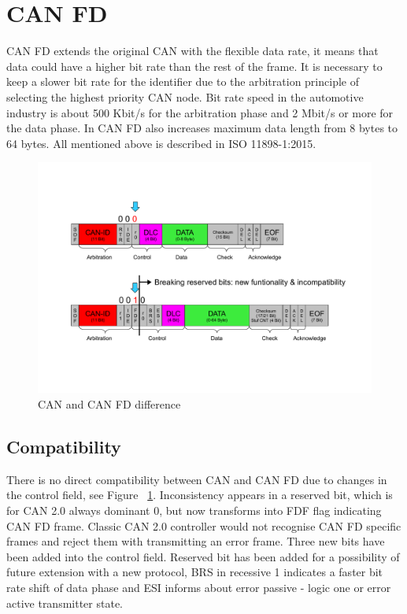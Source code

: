 \documentclass{ctuthesis}
\begin{document}
 \section{CAN FD}
  CAN FD extends the original CAN with the flexible data rate, it means that data could have a higher bit rate than the rest of the frame. It is necessary to keep a slower bit rate for the identifier due to the arbitration principle of selecting the highest priority CAN node\cite{priority_can}. Bit rate speed in the automotive industry is about 500 Kbit/s for the arbitration phase and 2 Mbit/s or more for the data phase\cite{canfd_calculator}. In CAN FD also increases maximum data length from 8 bytes to 64 bytes. All mentioned above is described in ISO 11898-1:2015.
  \begin{figure}[H]
  \includegraphics[width=1\textwidth]{agl2017-socketcan-can_fd}
  \caption{CAN and CAN FD difference \cite{canfd}}
  \label{fig:cancanfddifference}
  \end{figure}
  \subsection{Compatibility}
  \label{section:combability}
   There is no direct compatibility between CAN and CAN FD due to changes in the control field, see Figure ~\ref{fig:cancanfddifference}. Inconsistency appears in a reserved bit, which is for CAN 2.0 always dominant 0, but now transforms into FDF flag indicating CAN FD frame. Classic CAN 2.0 controller would not recognise CAN FD specific frames and reject them with transmitting an error frame. Three new bits have been added into the control field. Reserved bit has been added for a possibility of future extension with a new protocol, BRS in recessive 1 indicates a faster bit rate shift of data phase and ESI informs about error passive - logic one or error active transmitter state.
\end{document}
